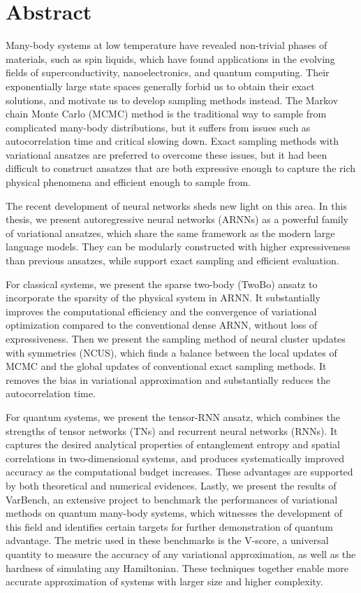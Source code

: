 \cleardoublepage
\chapter*{Abstract}

Many-body systems at low temperature have revealed non-trivial phases of materials, such as spin liquids, which have found applications in the evolving fields of superconductivity, nanoelectronics, and quantum computing. Their exponentially large state spaces generally forbid us to obtain their exact solutions, and motivate us to develop sampling methods instead.
The Markov chain Monte Carlo (MCMC) method is the traditional way to sample from complicated many-body distributions, but it suffers from issues such as autocorrelation time and critical slowing down. Exact sampling methods with variational ansatzes are preferred to overcome these issues, but it had been difficult to construct ansatzes that are both expressive enough to capture the rich physical phenomena and efficient enough to sample from.

The recent development of neural networks sheds new light on this area. In this thesis, we present autoregressive neural networks (ARNNs) as a powerful family of variational ansatzes, which share the same framework as the modern large language models. They can be modularly constructed with higher expressiveness than previous ansatzes, while support exact sampling and efficient evaluation.

For classical systems, we present the sparse two-body (TwoBo) ansatz to incorporate the sparsity of the physical system in ARNN. It substantially improves the computational efficiency and the convergence of variational optimization compared to the conventional dense ARNN, without loss of expressiveness.
Then we present the sampling method of neural cluster updates with symmetries (NCUS), which finds a balance between the local updates of MCMC and the global updates of conventional exact sampling methods. It removes the bias in variational approximation and substantially reduces the autocorrelation time.

For quantum systems, we present the tensor-RNN ansatz, which combines the strengths of tensor networks (TNs) and recurrent neural networks (RNNs). It captures the desired analytical properties of entanglement
entropy and spatial correlations in two-dimensional systems, and produces systematically improved accuracy as the computational budget increases. These advantages are supported by both theoretical
and numerical evidences.
Lastly, we present the results of VarBench, an extensive project to benchmark the performances of variational methods on quantum many-body systems, which witnesses the development of this field and identifies certain targets for further demonstration of quantum advantage. The metric used in these benchmarks is the V-score, a universal quantity to measure the accuracy of any variational approximation, as well as the hardness of simulating any Hamiltonian.
These techniques together enable more accurate approximation of systems with larger size and higher complexity.

